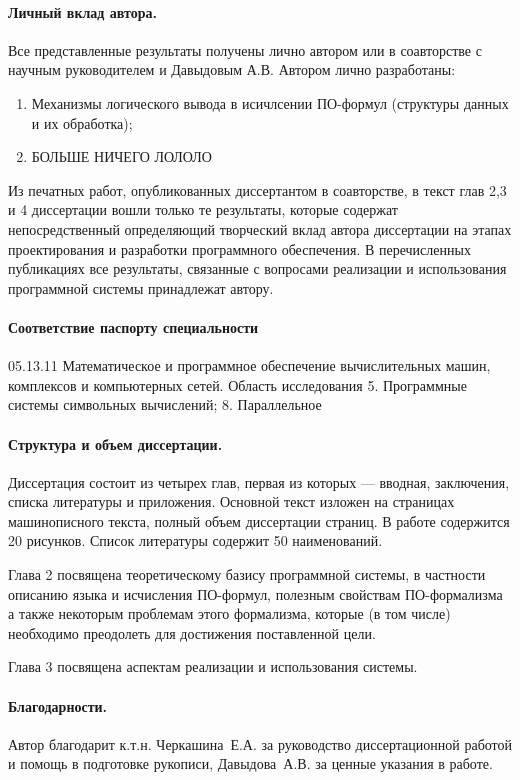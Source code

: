 \paragraph{Личный вклад автора.} Все представленные результаты получены лично автором или в соавторстве с научным руководителем и Давыдовым А.В. Автором лично разработаны:
\begin{enumerate}
\item Механизмы логического вывода в исичлсении ПО-формул (структуры данных и их обработка); 
\item БОЛЬШЕ НИЧЕГО ЛОЛОЛО
\end{enumerate}

Из печатных работ, опубликованных диссертантом в соавторстве, в текст глав 2,3 и 4 диссертации вошли только те результаты, которые содержат непосредственный определяющий творческий вклад автора диссертации на этапах проектирования и разработки программного обеспечения. В перечисленных публикациях все результаты, связанные с вопросами реализации и использования программной системы принадлежат автору.

\paragraph{Соответствие паспорту специальности}
05.13.11 Математическое и программное обеспечение вычислительных машин, комплексов и компьютерных сетей. Область исследования 5. Программные системы символьных вычислений; 8. Параллельное


\paragraph{Структура и объем диссертации.} Диссертация состоит из четырех глав, первая из которых --- вводная, заключения, списка литературы и приложения. Основной текст изложен на \pageref{pg:main} страницах машинописного текста, полный объем диссертации \pageref{pg:total} страниц. В работе содержится 20 рисунков. Список литературы содержит 50 наименований.

Глава 2 посвящена теоретическому базису программной системы, в частности описанию языка и исчисления ПО-формул, полезным свойствам ПО-формализма а также некоторым проблемам этого формализма, которые (в том числе) необходимо преодолеть для достижения поставленной цели.

Глава 3 посвящена аспектам реализации и использования системы. 

\paragraph{Благодарности.} Автор благодарит к.т.н. Черкашина~Е.А. за руководство диссертационной работой и помощь в подготовке рукописи, Давыдова~А.В. за ценные указания в работе.


